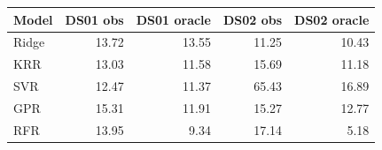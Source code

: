 \begin{tabular}{lrrrr}
\toprule
Model & DS01 obs & DS01 oracle & DS02 obs & DS02 oracle \\
\midrule
Ridge & 13.72 & 13.55 & 11.25 & 10.43 \\
KRR & 13.03 & 11.58 & 15.69 & 11.18 \\
SVR & 12.47 & 11.37 & 65.43 & 16.89 \\
GPR & 15.31 & 11.91 & 15.27 & 12.77 \\
RFR & 13.95 & 9.34 & 17.14 & 5.18 \\
\bottomrule
\end{tabular}
